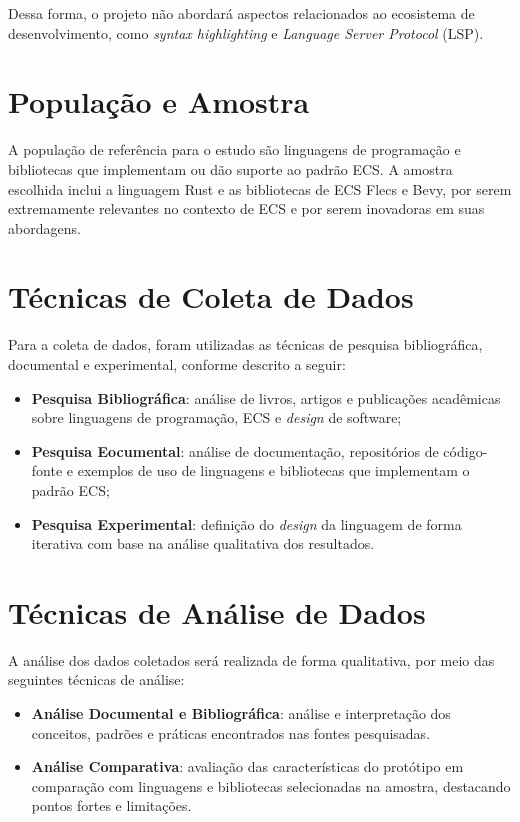 Dessa forma, o projeto não abordará aspectos relacionados ao ecosistema de desenvolvimento, como \textit{syntax highlighting} e \textit{Language Server Protocol} (LSP).

\section{População e Amostra}

A população de referência para o estudo são linguagens de programação e bibliotecas que implementam ou dão suporte ao padrão ECS. A amostra escolhida inclui a linguagem Rust e as bibliotecas de ECS Flecs e Bevy, por serem extremamente relevantes no contexto de ECS e por serem inovadoras em suas abordagens.

\section{Técnicas de Coleta de Dados}

Para a coleta de dados, foram utilizadas as técnicas de pesquisa bibliográfica, documental e experimental, conforme descrito a seguir:

\begin{itemize}
    \item \textbf{Pesquisa Bibliográfica}: análise de livros, artigos e publicações acadêmicas sobre linguagens de programação, ECS e \textit{design} de software;
    \item \textbf{Pesquisa Eocumental}: análise de documentação, repositórios de código-fonte e exemplos de uso de linguagens e bibliotecas que implementam o padrão ECS;
    \item \textbf{Pesquisa Experimental}: definição do \textit{design} da linguagem de forma iterativa com base na análise qualitativa dos resultados.
\end{itemize}

\section{Técnicas de Análise de Dados}

A análise dos dados coletados será realizada de forma qualitativa, por meio das seguintes técnicas de análise:

\begin{itemize}
    \item \textbf{Análise Documental e Bibliográfica}: análise e interpretação dos conceitos, padrões e práticas encontrados nas fontes pesquisadas.
    \item \textbf{Análise Comparativa}: avaliação das características do protótipo em comparação com linguagens e bibliotecas selecionadas na amostra, destacando pontos fortes e limitações.
\end{itemize}

